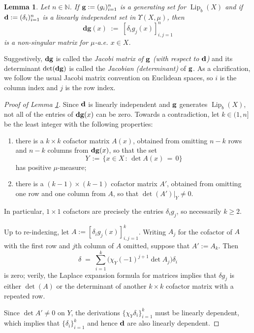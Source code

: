 \documentclass[reqno]{amsart}
\theoremstyle{plain}
\newtheorem{lemma}[thm]{Lemma}
\theoremstyle{definition}
\theoremstyle{remark}
\numberwithin{equation}{section}
\renewcommand{\d}{\delta}
\newcommand{\Lip}{\operatorname{Lip}}
\newcommand{\N}{\mathbb{N}}
\newcommand{\U}{\Upsilon}
\begin{document}
\begin{lemma} \label{lemma_nonsing}
Let $n \in \N$.  If ${\bf g} := (g_i)_{i=1}^n$ is a generating set for $\Lip_b(X)$ and if ${\bf d} := (\d_i)_{i=1}^n$ is a linearly independent set in $\U(X,\mu)$, then 
$$
\mathbf{d g}(x) \;:=\; [\d_ig_j(x)]_{i,j=1}^n
$$
is a non-singular matrix for $\mu$-a.e. $x \in X$.
\end{lemma}

Suggestively, ${\bf dg}$ is called the {\em Jacobi matrix of ${\bf g}$ (with respect to ${\bf d}$)} and its determinant $\det({\bf dg})$ is called the {\em Jacobian (determinant)} of ${\bf g}$.  As a clarification, we follow the usual Jacobi matrix convention on Euclidean spaces, so $i$ is the column index and $j$ is the row index.

\begin{proof}[Proof of Lemma \ref{lemma_nonsing}]
Since ${\bf d}$ is linearly independent and ${\bf g}$ generates $\Lip_b(X)$, not all of the entries of ${\bf dg}(x)$ can be zero. Towards a contradiction, let $k \in (1,n]$ be the least integer with the following properties:
\begin{enumerate}
\item there is a $k \times k$ cofactor matrix $A(x)$, obtained from omitting $n-k$ rows and $n-k$ columns from ${\bf dg}(x)$, so that the set
$$
Y \,:=\, \big\{ x \in X \,:\, \det A(x) \,=\, 0 \big\}
$$
has positive $\mu$-measure;
\vspace{.05in}
\item there is a $(k-1) \times (k-1)$ cofactor matrix $A'$, obtained from omitting one row and one column from $A$, so that $\det(A')|_Y \neq 0$.
\end{enumerate}
In particular, $1 \times 1$ cofactors are precisely the entries $\d_ig_j$, so necessarily $k \geq 2$.

Up to re-indexing, let $A := [\d_ig_j(x)]_{i,j=1}^k$.  Writing $A_j$ for the cofactor of $A$ with the first row and $j$th column of $A$ omitted, suppose that 
$A' := A_k$.  Then
\begin{equation} \label{eq_cofactorderiv}
\d \;=\; \sum_{i=1}^k \big( \chi_Y (-1)^{j+1} \det A_j \big) \d_i
\end{equation}
is zero; verily, the Laplace expansion formula for matrices implies that $\d g_j$ is either $\det(A)$ or the determinant of another $k\times k$ cofactor matrix with a repeated row.

Since $\det A' \neq 0$ on $Y$, the derivations $\{\chi_Y\d_i\}_{i=1}^k$ must be linearly dependent, which implies that $\{\d_i\}_{i=1}^k$ and hence ${\bf d}$ are also linearly dependent.
\end{proof}
\end{document}
